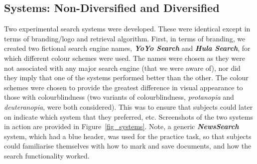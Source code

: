 \subsection{Systems: Non-Diversified and Diversified}\label{sec:method:systems}
Two experimental search systems were developed. These were identical except in terms of branding/logo and retrieval algorithm. First, in terms of branding, we created two fictional search engine names,
\textbf{\emph{YoYo Search}} and \textbf{\emph{Hula Search}}, for which different colour schemes were used. The names were chosen as they were not associated with any major search engine (that we were aware of), nor did they imply that one of the systems performed better than the other. The colour schemes were chosen to provide the greatest difference in visual appearance to those with colourblindness (two variants of colourblindness, \emph{protanopia} and \emph{deuteranopia}, were both considered). This was to ensure that subjects could later on indicate which system that they preferred, etc. Screenshots of the two systems in action are provided in Figure~\ref{fig_systems}. 
Note, a generic \textbf{\emph{NewsSearch}} system, which had a blue header, was used for the practice task, so that subjects could familiarise themselves with how to mark and save documents, and how the search functionality worked.

    
    
    

